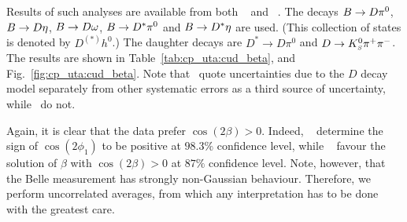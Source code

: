 Results of such analyses are available from both 
\belle~\cite{Krokovny:2006sv} and \babar~\cite{Aubert:2007rp}.
The decays $B \to D\pi^0$, $B \to D\eta$, $B \to D\omega$, 
$B \to D^*\pi^0$ and $B \to D^*\eta$ are used. 
(This collection of states is denoted by $D^{(*)}h^0$.)
The daughter decays are $D^* \to D\pi^0$ and $D \to K^0_{\scriptscriptstyle S}\pi^+\pi^-$.
The results are shown in Table~\ref{tab:cp_uta:cud_beta},
and Fig.~\ref{fig:cp_uta:cud_beta}.
Note that \babar\ quote uncertainties due to the $D$ decay model 
separately from other systematic errors as a third source of uncertainty, while \belle\ do not.



Again, it is clear that the data prefer $\cos(2\beta)>0$.
Indeed, \belle~\cite{Krokovny:2006sv} 
determine the sign of $\cos(2\phi_1)$ to be positive at $98.3\%$ confidence level,
while \babar~\cite{Aubert:2007rp} 
favour the solution of $\beta$ with $\cos(2\beta)>0$ at $87\%$ confidence level.
Note, however, that the Belle measurement has strongly non-Gaussian behaviour. 
Therefore, we perform uncorrelated averages, 
from which any interpretation has to be done with the greatest care. 

